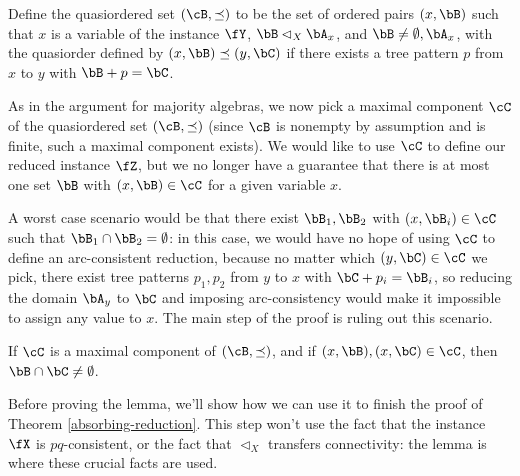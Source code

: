 \begin{defn} Define the quasiordered set $(\cB, \preceq)$ to be the set of ordered pairs $(x,\bB)$ such that $x$ is a variable of the instance $\fY$, $\bB \lhd_X \bA_x$, and $\bB \ne \emptyset,\bA_x$, with the quasiorder defined by $(x,\bB) \preceq (y,\bC)$ if there exists a tree pattern $p$ from $x$ to $y$ with $\bB + p = \bC$.
\end{defn}

As in the argument for majority algebras, we now pick a maximal component $\cC$ of the quasiordered set $(\cB,\preceq)$ (since $\cB$ is nonempty by assumption and is finite, such a maximal component exists). We would like to use $\cC$ to define our reduced instance $\fZ$, but we no longer have a guarantee that there is at most one set $\bB$ with $(x,\bB) \in \cC$ for a given variable $x$.

A worst case scenario would be that there exist $\bB_1, \bB_2$ with $(x,\bB_i) \in \cC$ such that $\bB_1 \cap \bB_2 = \emptyset$: in this case, we would have no hope of using $\cC$ to define an arc-consistent reduction, because no matter which $(y,\bC) \in \cC$ we pick, there exist tree patterns $p_1, p_2$ from $y$ to $x$ with $\bC + p_i = \bB_i$, so reducing the domain $\bA_y$ to $\bC$ and imposing arc-consistency would make it impossible to assign any value to $x$. The main step of the proof is ruling out this scenario.

\begin{lem} If $\cC$ is a maximal component of $(\cB,\preceq)$, and if $(x,\bB), (x,\bC) \in \cC$, then $\bB \cap \bC \ne \emptyset$.
\end{lem}

Before proving the lemma, we'll show how we can use it to finish the proof of Theorem \ref{absorbing-reduction}. This step won't use the fact that the instance $\fX$ is $pq$-consistent, or the fact that $\lhd_X$ transfers connectivity: the lemma is where these crucial facts are used.

